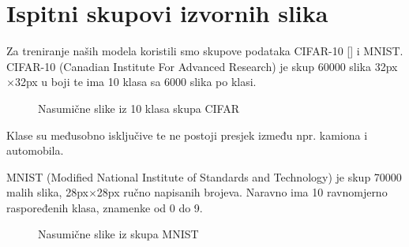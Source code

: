 \chapter{Ispitni skupovi izvornih slika}

Za treniranje naših modela koristili smo skupove podataka CIFAR-10 [\cite{alexkrizhevsky2009}] i MNIST.\\
CIFAR-10 (Canadian Institute For Advanced Research) je skup 60000 slika 32px$\times$32px u boji te ima 10 klasa sa 6000 slika po klasi.

\begin{figure}[h]
	\caption{Nasumične slike iz 10 klasa skupa CIFAR}
	\label{cifar}
\end{figure}

Klase su međusobno isključive te ne postoji presjek između npr. kamiona i automobila. \pagebreak

MNIST (Modified National Institute of Standards and Technology) je skup 70000 malih slika, 28px$\times$28px ručno napisanih brojeva. Naravno ima 10 ravnomjerno raspoređenih klasa, znamenke od 0 do 9.\\

\begin{figure}[h]
	\caption{Nasumične slike iz skupa MNIST}
	\label{mnist}
\end{figure}